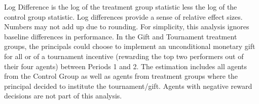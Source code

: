 \begin{landscape}
\begin{table}[h]
\begin{center}
\begin{minipage}{1.2\textwidth}
Log Difference is the log of the treatment group statistic less the log of the control group statistic. Log differences provide a sense of relative effect sizes. 
Numbers may not add up due to rounding. 
For simplicity, this analysis ignores baseline differences in performance. 
In the Gift and Tournament treatment groups, the principals could choose to implement an unconditional monetary gift for all or of a tournament incentive (rewarding the top two performers out of their four agents) between Periods 1 and 2. 
The estimation includes all agents from the Control Group as well as agents from treatment groups where the principal decided to institute the tournament/gift. Agents with negative reward decisions are not part of this analysis. 
\end{minipage}
\end{center}
\end{table}
\end{landscape}